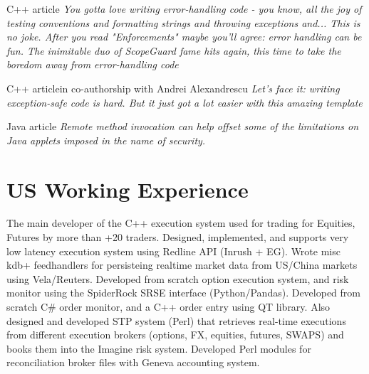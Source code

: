 \documentclass[8pt,a4paper,sans]{moderncv}
\begin{document}
        {C++ article}
        {\textit{You gotta love writing error-handling code - you know, all the joy of testing conventions and
            formatting strings and throwing exceptions and... This is no joke. After you read "Enforcements"
            maybe you'll agree: error handling can be fun. The inimitable duo of ScopeGuard fame hits again,
            this time to take the boredom away from error-handling code}}
 
        {C++ article}{in co-authorship with Andrei Alexandrescu}
        {\textit{Let's face it: writing exception-safe code is hard. But it just got a lot easier with this amazing template}}

        {Java article}{}
        {\textit{Remote method invocation can help offset some of the limitations on Java applets imposed in the name of security.}}

\section{US Working Experience}

        {The main developer of the C++ execution system used for trading for Equities, Futures by more than +20 traders. 
          Designed, implemented, and supports very low latency execution system using Redline API (Inrush + EG).
          Wrote misc kdb+ feedhandlers for persisteing realtime market data from US/China markets using Vela/Reuters.
          Developed from scratch option execution system, and risk monitor using the SpiderRock SRSE interface (Python/Pandas).
          Developed from scratch C\# order monitor, and a C++ order entry using QT library.
          Also designed and developed STP system (Perl) that retrieves real-time executions from
          different execution brokers (options, FX, equities, futures, SWAPS) and books them into the Imagine risk system.
          Developed Perl modules for reconciliation broker files with Geneva accounting system.}
\end{document}
